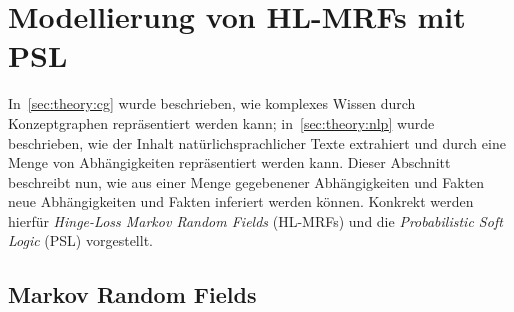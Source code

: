 \section{Modellierung von HL-MRFs mit PSL}%
\label{sec:theory:psl}

In~\ref{sec:theory:cg} wurde beschrieben, wie komplexes Wissen durch Konzeptgraphen repräsentiert werden kann;
in~\ref{sec:theory:nlp} wurde beschrieben, wie der Inhalt natürlichsprachlicher Texte extrahiert und durch eine Menge von Abhängigkeiten repräsentiert werden kann.
Dieser Abschnitt beschreibt nun, wie aus einer Menge gegebenener Abhängigkeiten und Fakten neue Abhängigkeiten und Fakten inferiert werden können.
Konkrekt werden hierfür \textit{Hinge-Loss Markov Random Fields} (HL-MRFs) und die \textit{Probabilistic Soft Logic} (PSL) vorgestellt.

\subsection{Markov Random Fields}%
\label{sec:theory:psl:mrf}

